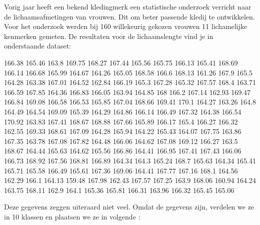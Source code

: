 \documentclass[12pt,twoside,a4paper]{article}
\begin{document}
Vorig jaar heeft een bekend kledingmerk een statistische onderzoek verricht naar de lichaamsafmetingen van vrouwen. Dit om beter passende kledij te ontwikkelen. Voor het onderzoek werden bij 160 willekeurig gekozen vrouwen 11 lichamelijke kenmerken gemeten. De resultaten voor de lichaamslengte vind je in onderstaande dataset:

\begin{center}
\singlespacing
\scriptsize
166.38 165.46 163.8 169.75 168.27 167.44 165.56 165.75 166.13 165.41 168.69 166.14 166.68 165.99 164.67 164.26 165.05 168.58 166.6 168.13 161.26 167.9 165.5 164.28 163.38 167.01 164.52 162.84 166.19 165.3 167.28 165.32 167.57 168.4 163.71 166.59 167.85 164.36 166.83 166.05 163.94 164.85 168 166.2 167.14 162.93 169.47 166.84 169.08 166.58 166.53 165.85 167.04 168.66 169.41 170.1 164.27 163.26 164.8 164.49 164.54 169.09 165.39 164.29 164.86 166.14 166.49 167.32 164.38 166.54 170.92 163.83 167.41 168.67 168.88 167.66 165.89 166.17 165.4 166.27 166.32 162.55 169.33 168.61 167.09 164.28 165.94 164.22 165.43 164.07 167.75 163.86 167.35 163.78 167.08 167.82 164.48 166.06 164.62 167.08 169.12 166.27 163.5 168.67 164.44 165.63 164.62 165.56 166.86 164.41 166.95 167.41 167.43 166.06 166.73 168.92 167.56 168.81 166.89 164.34 164.3 165.24 168.7 165.63 164.34 165.41 165.71 165.58 166.49 165.61 167.36 169.06 164.41 167.77 167.16 168.1 164.56 162.29 166.1 164.13 159.48 167.98 162.43 167.57 167.25 163.9 168.06 160.94 164.24 163.75 168.11 162.9 164.1 165.36 165.81 166.31 163.96 166.32 165.45 165.06
\end{center}

Deze gegevens zeggen uiteraard niet veel. Omdat de gegevens \arule{4cm} zijn, verdelen we ze in 10 klassen en plaatsen we ze in volgende \arule{4cm}:
\end{document}
